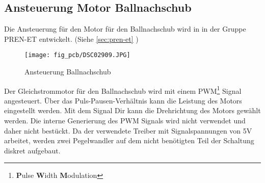 \subsection{Ansteuerung Motor Ballnachschub}
\label{sec:dc}
Die Ansteuerung für den Motor für den Ballnachschub wird in in der Gruppe 
PREN-ET entwickelt. (Siehe \ref{sec:pren-et} )
\begin{figure}[h!]
    \centering
    \texttt{[image: fig\_pcb/DSC02909.JPG]}
    \caption{Ansteuerung Ballnachschub}
    \label{fig:dc}
\end{figure}

\noindent
Der Gleichstrommotor für den Ballnachschub wird mit einem 
PWM\footnote{\textbf{P}ulse \textbf{W}idth \textbf{M}odulation} Signal 
angesteuert. Über das Puls-Pausen-Verhältnis kann die Leistung des Motors 
eingestellt werden. Mit dem Signal Dir kann die Drehrichtung des Motors 
gewählt werden. Die interne Generierung des PWM Signals wird nicht verwendet 
und daher nicht bestückt. Da der verwendete Treiber mit Signalspannungen von 
5\si{\volt} arbeitet, werden zwei Pegelwandler auf dem nicht benötigten Teil 
der Schaltung diskret aufgebaut. 
